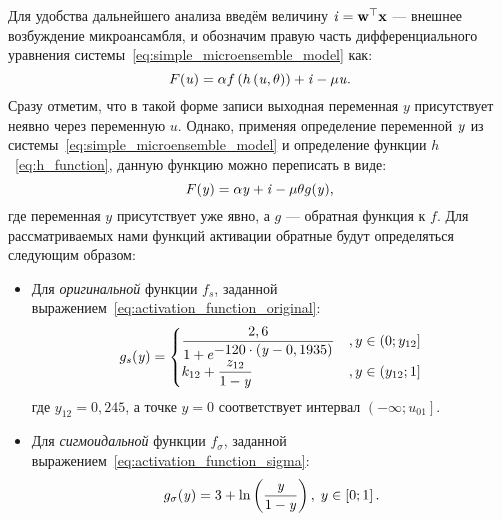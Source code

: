 Для удобства дальнейшего анализа введём величину $\mathit{i} = \mathrm{\mathbf{w}}^{\top} \mathrm{\mathbf{x}}$ --- внешнее возбуждение микроансамбля, и обозначим правую часть дифференциального уравнения системы~\eqref{eq:simple_microensemble_model} как:
\begin{equation}
    \label{eq:functional_u}
    F(\mathit{u}) = \alpha f\left( h\left( \mathit{u}, \theta \right) \right) + \mathit{i} - \mu \mathit{u}.
\end{equation}
Сразу отметим, что в такой форме записи выходная переменная $y$ присутствует неявно через переменную $u$. Однако, применяя определение переменной $\mathit{y}$ из системы~\eqref{eq:simple_microensemble_model} и определение функции $h$~\eqref{eq:h_function}, данную функцию можно переписать в виде:
\begin{equation}
    \label{eq:functional_y}
    F(\mathit{y}) = \alpha \mathit{y} + \mathit{i} - \mu \theta g(\mathit{y}),
\end{equation}
где переменная $y$ присутствует уже явно, а $g$ --- обратная функция к $f$. Для рассматриваемых нами функций активации обратные будут определяться следующим образом:
\begin{itemize}
    \item Для \textit{оригинальной} функции $f_{s}$, заданной выражением~\eqref{eq:activation_function_original}:
    \begin{equation}
        \label{eq:unactivation_function_original}
        g_{s}(\mathit{y}) = 
        \begin{cases}
            \dfrac{2,6}{1 + e^{\displaystyle -120 \cdot (\mathit{y} - 0,1935)}} &, y \in \left(0; y_{12}\right] \\
            k_{12} + \dfrac{z_{12}}{1 - \mathit{y}}                             &, y \in \left(y_{12}; 1\right] \\
        \end{cases}
    \end{equation}
    где $y_{12} = 0,245$, а точке $y = 0$ соответствует интервал $\left(-\infty; u_{01}\right]$.
    \item Для \textit{сигмоидальной} функции $f_{\sigma}$, заданной выражением~\eqref{eq:activation_function_sigma}:
    \begin{equation}
        \label{eq:unactivation_function_sigma}
        g_{\sigma}(\mathit{y}) = 3 + \ln\left(\dfrac{\mathit{y}}{1 - \mathit{y}}\right),\;y \in \left[0; 1\right].
    \end{equation}
\end{itemize}

